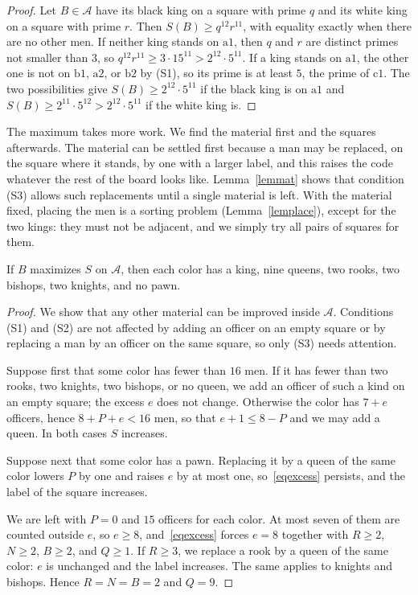 \documentclass[12pt,reqno]{article}
\newcommand{\adm}{\mathcal{A}}
\newcommand{\sq}[1]{\mathrm{#1}}
\begin{document}
\begin{proof}
Let $B\in\adm$ have its black king on a square with prime $q$ and its white king on a square
with prime $r$. Then $S(B)\geq q^{12}r^{11}$, with equality exactly when there are no other men.
If neither king stands on $\sq{a1}$, then $q$ and $r$ are distinct primes not smaller than $3$, so
$q^{12}r^{11}\geq 3\cdot 15^{11}>2^{12}\cdot 5^{11}$. If a king stands on $\sq{a1}$, the other one is
not on $\sq{b1}$, $\sq{a2}$, or $\sq{b2}$ by (S1), so its prime is at least $5$, the prime of $\sq{c1}$.
The two possibilities give $S(B)\geq 2^{12}\cdot 5^{11}$ if the black king is on $\sq{a1}$ and
$S(B)\geq 2^{11}\cdot 5^{12}>2^{12}\cdot 5^{11}$ if the white king is.
\end{proof}

The maximum takes more work. We find the material first and the squares afterwards. The
material can be settled first because a man may be replaced, on the square where it stands, by
one with a larger label, and this raises the code whatever the rest of the board looks like.
Lemma~\ref{lemmat} shows that condition (S3) allows such replacements until a single material
is left. With the material fixed, placing the men is a sorting problem
(Lemma~\ref{lemplace}), except for the two kings: they must not be adjacent, and we simply try
all pairs of squares for them.

\begin{lemma}\label{lemmat}
If $B$ maximizes $S$ on $\adm$, then each color has a king, nine queens, two rooks, two bishops,
two knights, and no pawn.
\end{lemma}

\begin{proof}
We show that any other material can be improved inside $\adm$. Conditions (S1) and (S2) are not
affected by adding an officer on an empty square or by replacing a man by an officer on the same
square, so only (S3) needs attention.

Suppose first that some color has fewer than $16$ men. If it has fewer than two rooks, two
knights, two bishops, or no queen, we add an officer of such a kind on an empty square; the
excess $e$ does not change. Otherwise the color has $7+e$ officers, hence $8+P+e<16$ men, so
that $e+1\leq 8-P$ and we may add a queen. In both cases $S$ increases.

Suppose next that some color has a pawn. Replacing it by a queen of the same color lowers $P$
by one and raises $e$ by at most one, so~\eqref{eqexcess} persists, and the label of the square
increases.

We are left with $P=0$ and $15$ officers for each color. At most seven of them are counted
outside $e$, so $e\geq 8$, and~\eqref{eqexcess} forces $e=8$ together with $R\geq 2$, $N\geq 2$,
$B\geq 2$, and $Q\geq 1$. If $R\geq 3$, we replace a rook by a queen of the same color: $e$ is
unchanged and the label increases. The same applies to knights and bishops. Hence
$R=N=B=2$ and $Q=9$.
\end{proof}
\end{document}
